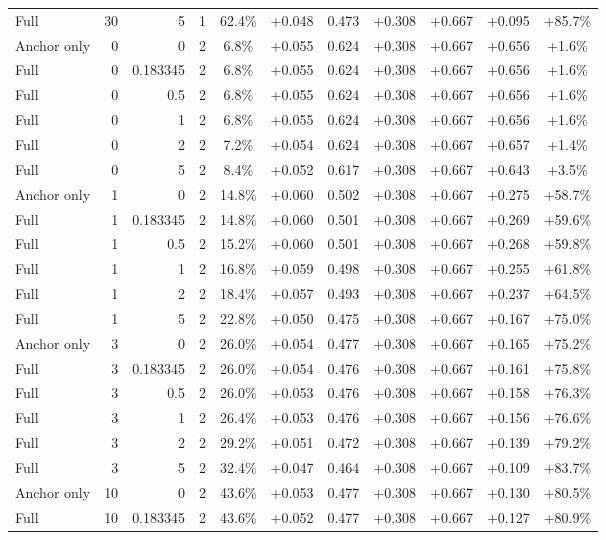 \begin{table}[htbp]
\begin{tabular}{lrrrccccccc}
Full & 30 & 5 & 1 & 62.4\% & +0.048 & 0.473 & +0.308 & +0.667 & +0.095 & +85.7\% \\
Anchor only & 0 & 0 & 2 & 6.8\% & +0.055 & 0.624 & +0.308 & +0.667 & +0.656 & +1.6\% \\
Full & 0 & 0.183345 & 2 & 6.8\% & +0.055 & 0.624 & +0.308 & +0.667 & +0.656 & +1.6\% \\
Full & 0 & 0.5 & 2 & 6.8\% & +0.055 & 0.624 & +0.308 & +0.667 & +0.656 & +1.6\% \\
Full & 0 & 1 & 2 & 6.8\% & +0.055 & 0.624 & +0.308 & +0.667 & +0.656 & +1.6\% \\
Full & 0 & 2 & 2 & 7.2\% & +0.054 & 0.624 & +0.308 & +0.667 & +0.657 & +1.4\% \\
Full & 0 & 5 & 2 & 8.4\% & +0.052 & 0.617 & +0.308 & +0.667 & +0.643 & +3.5\% \\
Anchor only & 1 & 0 & 2 & 14.8\% & +0.060 & 0.502 & +0.308 & +0.667 & +0.275 & +58.7\% \\
Full & 1 & 0.183345 & 2 & 14.8\% & +0.060 & 0.501 & +0.308 & +0.667 & +0.269 & +59.6\% \\
Full & 1 & 0.5 & 2 & 15.2\% & +0.060 & 0.501 & +0.308 & +0.667 & +0.268 & +59.8\% \\
Full & 1 & 1 & 2 & 16.8\% & +0.059 & 0.498 & +0.308 & +0.667 & +0.255 & +61.8\% \\
Full & 1 & 2 & 2 & 18.4\% & +0.057 & 0.493 & +0.308 & +0.667 & +0.237 & +64.5\% \\
Full & 1 & 5 & 2 & 22.8\% & +0.050 & 0.475 & +0.308 & +0.667 & +0.167 & +75.0\% \\
Anchor only & 3 & 0 & 2 & 26.0\% & +0.054 & 0.477 & +0.308 & +0.667 & +0.165 & +75.2\% \\
Full & 3 & 0.183345 & 2 & 26.0\% & +0.054 & 0.476 & +0.308 & +0.667 & +0.161 & +75.8\% \\
Full & 3 & 0.5 & 2 & 26.0\% & +0.053 & 0.476 & +0.308 & +0.667 & +0.158 & +76.3\% \\
Full & 3 & 1 & 2 & 26.4\% & +0.053 & 0.476 & +0.308 & +0.667 & +0.156 & +76.6\% \\
Full & 3 & 2 & 2 & 29.2\% & +0.051 & 0.472 & +0.308 & +0.667 & +0.139 & +79.2\% \\
Full & 3 & 5 & 2 & 32.4\% & +0.047 & 0.464 & +0.308 & +0.667 & +0.109 & +83.7\% \\
Anchor only & 10 & 0 & 2 & 43.6\% & +0.053 & 0.477 & +0.308 & +0.667 & +0.130 & +80.5\% \\
Full & 10 & 0.183345 & 2 & 43.6\% & +0.052 & 0.477 & +0.308 & +0.667 & +0.127 & +80.9\% \\

\end{tabular}
\end{table}
